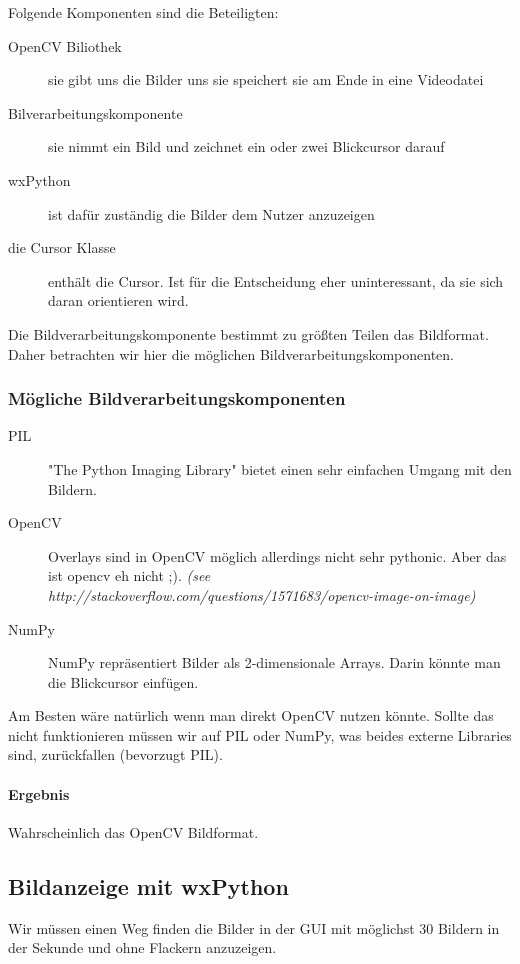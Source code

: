 \documentclass[a4paper,draft]{scrartcl}
\begin{document}
Folgende Komponenten sind die Beteiligten:
\begin{description}
  \item[OpenCV Biliothek] sie gibt uns die Bilder uns sie speichert sie am Ende in eine Videodatei
  \item[Bilverarbeitungskomponente] sie nimmt ein Bild und zeichnet ein oder zwei Blickcursor darauf
  \item[wxPython] ist dafür zuständig die Bilder dem Nutzer anzuzeigen
  \item[die Cursor Klasse] enthält die Cursor. Ist für die Entscheidung eher uninteressant, da sie sich daran orientieren wird.
\end{description}

Die Bildverarbeitungskomponente bestimmt zu größten Teilen das Bildformat. Daher betrachten wir hier die möglichen Bildverarbeitungskomponenten.

\subsubsection*{Mögliche Bildverarbeitungskomponenten}
\begin{description}
  \item[PIL] "The Python Imaging Library" bietet einen sehr einfachen Umgang mit den Bildern.
  \item[OpenCV] Overlays sind in OpenCV möglich allerdings nicht sehr pythonic. Aber das ist opencv eh nicht ;). \textit{(see http://stackoverflow.com/questions/1571683/opencv-image-on-image)}
  \item[NumPy] NumPy repräsentiert Bilder als 2-dimensionale Arrays. Darin könnte man die Blickcursor einfügen.
\end{description}

Am Besten wäre natürlich wenn man direkt OpenCV nutzen könnte. Sollte das nicht funktionieren müssen wir auf PIL oder NumPy, was beides externe Libraries sind, zurückfallen (bevorzugt PIL).

\paragraph*{Ergebnis}
Wahrscheinlich das OpenCV Bildformat.

\subsection*{Bildanzeige mit wxPython}
Wir müssen einen Weg finden die Bilder in der GUI mit möglichst 30 Bildern in der Sekunde und ohne Flackern anzuzeigen.
\end{document}
